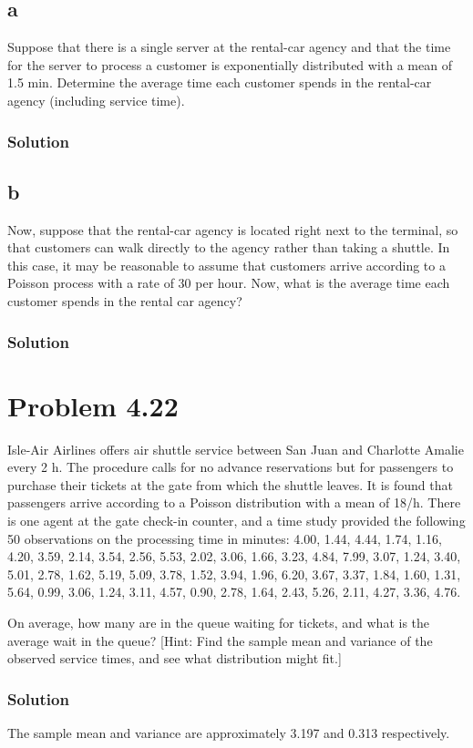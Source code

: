\documentclass[letterpaper]{amsart}
\begin{document}
\subsection*{a}
Suppose that there is a single server at the rental-car agency and that the
time for the server to process a customer is exponentially distributed
with a mean of 1.5 min. Determine the average time each customer
spends in the rental-car agency (including service time).
\subsubsection*{Solution}

\subsection*{b}
Now, suppose that the rental-car agency is located right next to the
terminal, so that customers can walk directly to the agency rather than
taking a shuttle. In this case, it may be reasonable to assume that
customers arrive according to a Poisson process with a rate of 30 per
hour. Now, what is the average time each customer spends in the rental
car agency?
\subsubsection*{Solution}

\section{Problem 4.22} %
Isle-Air Airlines offers air shuttle service between San Juan and Charlotte
Amalie every 2 h. The procedure calls for no advance reservations but
for passengers to purchase their tickets at the gate from which the shuttle
leaves. It is found that passengers arrive according to a Poisson distribution
with a mean of 18/h. There is one agent at the gate check-in counter, and
a time study provided the following 50 observations on the processing time
in minutes: 4.00, 1.44, 4.44, 1.74, 1.16, 4.20, 3.59, 2.14, 3.54, 2.56, 5.53, 2.02, 3.06,
1.66, 3.23, 4.84, 7.99, 3.07, 1.24, 3.40, 5.01, 2.78, 1.62, 5.19, 5.09, 3.78,
1.52, 3.94, 1.96, 6.20, 3.67, 3.37, 1.84, 1.60, 1.31, 5.64, 0.99, 3.06, 1.24,
3.11, 4.57, 0.90, 2.78, 1.64, 2.43, 5.26, 2.11, 4.27, 3.36, 4.76.

On average, how many are in the queue waiting for tickets, and what is the
average wait in the queue? [Hint: Find the sample mean and variance of
the observed service times, and see what distribution might fit.]
\subsubsection*{Solution}
The sample mean and variance are approximately 3.197 and 0.313 respectively.
\end{document}
